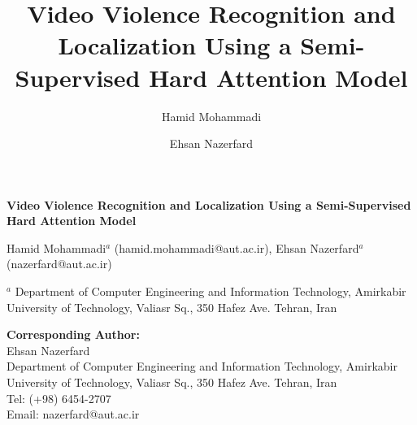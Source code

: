 \documentclass[review]{elsarticle}
\begin{document}
\begin{frontmatter}


\begin{titlepage}
\begin{center}
\vspace*{1cm}

\textbf{ \large Video Violence Recognition and Localization Using a Semi-Supervised Hard Attention Model}

\vspace{1.5cm}

Hamid Mohammadi$^a$ (hamid.mohammadi@aut.ac.ir), Ehsan Nazerfard$^a$ (nazerfard@aut.ac.ir) \\

\hspace{10pt}

\begin{flushleft}
\small  
$^a$ Department of Computer Engineering and Information Technology, Amirkabir University of Technology, Valiasr Sq., 350 Hafez Ave. Tehran, Iran

\vspace{1cm}
\textbf{Corresponding Author:} \\
Ehsan Nazerfard \\
Department of Computer Engineering and Information Technology, Amirkabir University of Technology, Valiasr Sq., 350 Hafez Ave. Tehran, Iran \\
Tel: (+98) 6454-2707 \\
Email: nazerfard@aut.ac.ir

\end{flushleft}        
\end{center}
\end{titlepage}

\title{Video Violence Recognition and Localization Using a Semi-Supervised Hard Attention Model}

\author[label1]{Hamid Mohammadi}

\author[label1]{Ehsan Nazerfard }

\address[label1]{Department of Computer Engineering and Information Technology, Amirkabir University of Technology, Valiasr Sq., 350 Hafez Ave. Tehran, Iran}


\end{frontmatter}
\end{document}
